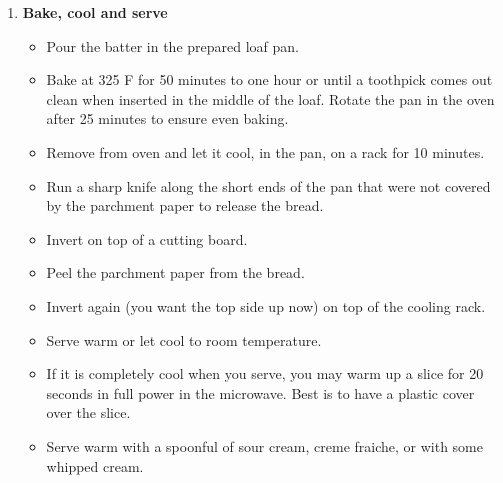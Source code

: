 \documentclass [11pt, letterpaper] {article}
\begin{document}
\begin {description}
\begin {enumerate}
	\item {\bf Bake, cool and serve}
	\begin{itemize}
	\item Pour the batter in the prepared loaf pan.
	\item Bake at 325 F for 50 minutes to one hour or until a toothpick comes out clean when inserted in the middle of the loaf. Rotate the pan in the oven after 25 minutes to ensure even baking.
	\item Remove from oven and let it cool, in the pan,  on a rack for 10 minutes.
	\item Run a sharp knife along the short ends of the pan that were not covered by the parchment paper to release the bread.
	\item Invert on top of a cutting board.
	\item Peel the parchment paper from the bread.
	\item Invert again (you want the top side up now) on top of the cooling rack. 
	\item Serve warm or let cool to room temperature.
	\item If it is completely cool when you serve, you may warm up a slice for 20 seconds in full power in the microwave. Best is to have a plastic cover over the slice. 
	\item Serve warm with a spoonful of sour cream, creme fraiche,  or with some whipped cream.
	\end{itemize}
	
	\end{enumerate}
\end{description}
\end{document}
